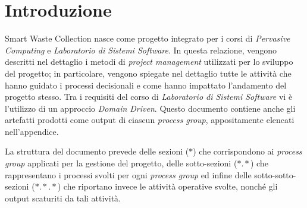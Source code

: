 \section*{Introduzione}
\label{sec:introduction}

Smart Waste Collection nasce come progetto integrato per i corsi di \textit{Pervasive Computing} e \textit{Laboratorio di Sistemi Software}.
In questa relazione, vengono descritti nel dettaglio i metodi di \textit{project management} utilizzati per lo sviluppo del progetto; in particolare, vengono spiegate nel dettaglio tutte le attività che hanno guidato i processi decisionali e come hanno impattato l'andamento del progetto stesso.
Tra i requisiti del corso di \textit{Laboratorio di Sistemi Software} vi è l'utilizzo di un approccio \textit{Domain Driven}. Questo documento contiene anche gli artefatti prodotti come output di ciascun \textit{process group}, appositamente elencati nell'appendice.

La struttura del documento prevede delle sezioni ($*$) che corrispondono ai \textit{process group} applicati per la gestione del progetto, delle sotto-sezioni ($*.*$) che rappresentano i processi svolti per ogni \textit{process group} ed infine delle sotto-sotto-sezioni ($*.*.*$) che riportano invece le attività operative svolte, nonché gli output scaturiti da tali attività.